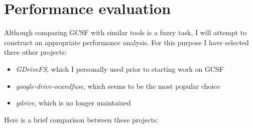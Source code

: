 \chapter{Performance evaluation}

Although comparing GCSF with similar tools is a fuzzy task, I will attempt to construct an appropriate performance analysis. For this purpose I have selected three other projects:

\begin{itemize}
  \item \emph{GDriveFS}, which I personally used prior to starting work on GCSF
  \item \emph{google-drive-ocamlfuse}, which seems to be the most popular choice
  \item \emph{gdrive}, which is no longer maintained
\end{itemize}


Here is a brief comparison between these projects:

